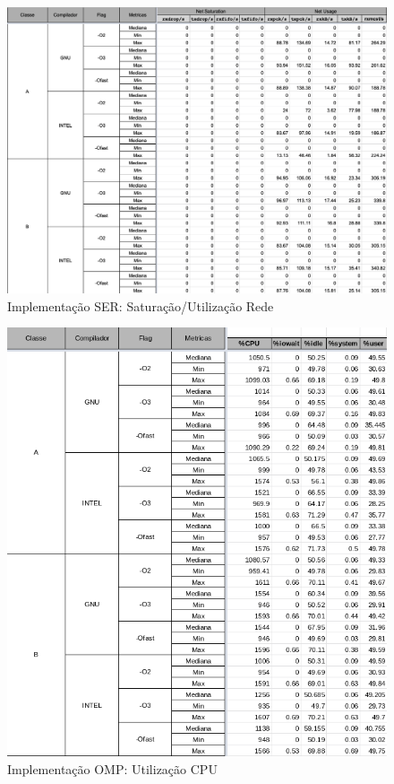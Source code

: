 \documentclass{article}
\begin{document}
\begin{appendices}
\begin{figure}[H]
    \centering
    \includegraphics[width=12cm]{Pictures/LUMZ_r641_SER_NET.png}
    \caption{Implementação SER: Saturação/Utilização Rede}
    \label{figure:LUMZ_r641_SER_NT}
\end{figure}



\begin{figure}[H]
    \centering
    \includegraphics[width=12cm]{Pictures/LUMZ_r641_OMP_CPU.png}
    \caption{Implementação OMP: Utilização CPU}
    \label{figure:LUMZ_r641_OMP_CPU}
\end{figure}


\end{appendices}
\end{document}
